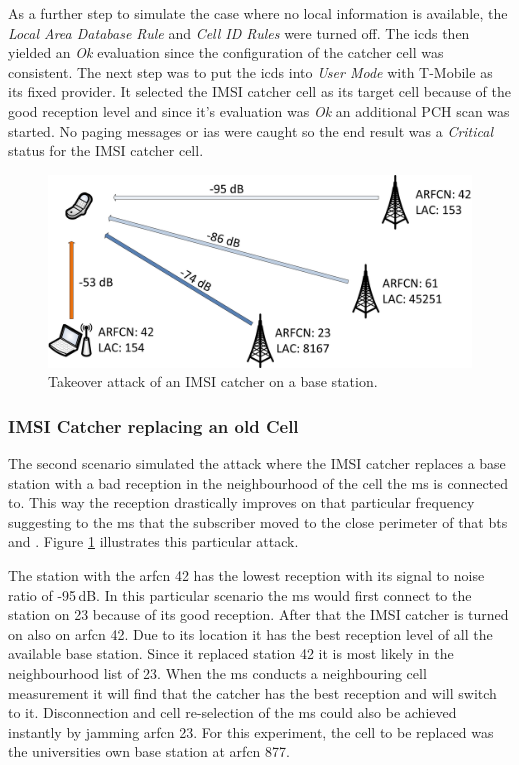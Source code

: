 As a further step to simulate the case where no local information is available, the \emph{Local Area Database Rule} and \emph{Cell ID Rules} were turned off.
The \gls{icds} then yielded an \emph{Ok} evaluation since the configuration of the catcher cell was consistent.
The next step was to put the \gls{icds} into \emph{User Mode} with T-Mobile as its fixed provider. 
It selected the IMSI catcher cell as its target cell because of the good reception level and since it's evaluation was \emph{Ok} an additional PCH scan was started.
No paging messages or \glspl{ia} were caught so the end result was a \emph{Critical} status for the IMSI catcher cell.

\begin{figure}
\centering
\includegraphics{../Images/replace_attack}
\caption{Takeover attack of an IMSI catcher on a base station.}
\label{fig:takeover_attack}
\end{figure}

\subsubsection{IMSI Catcher replacing an old Cell}
The second scenario simulated the attack where the IMSI catcher replaces a base station with a bad reception in the neighbourhood of the cell the \gls{ms} is connected to.
This way the reception drastically improves on that particular frequency suggesting to the \gls{ms} that the subscriber moved to the close perimeter of that \gls{bts} and .
Figure \ref{fig:takeover_attack} illustrates this particular attack.

The station with the \gls{arfcn} 42 has the lowest reception with its signal to noise ratio of -95\,dB.
In this particular scenario the \gls{ms} would first connect to the station on 23 because of its good reception.
After that the IMSI catcher is turned on also on \gls{arfcn} 42.
Due to its location it has the best reception level of all the available base station.
Since it replaced station 42 it is most likely in the neighbourhood list of 23.
When the \gls{ms} conducts a neighbouring cell measurement it will find that the catcher has the best reception and will switch to it.
Disconnection and cell re-selection of the \gls{ms} could also be achieved instantly by jamming \gls{arfcn} 23.
For this experiment, the cell to be replaced was the universities own base station at \gls{arfcn} 877.

